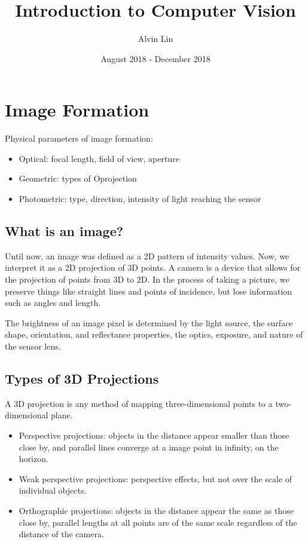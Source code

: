 \documentclass{math}
\title{Introduction to Computer Vision}
\author{Alvin Lin}
\date{August 2018 - December 2018}
\begin{document}
\maketitle

\section*{Image Formation}
Physical parameters of image formation:
\begin{itemize}
  \item Optical: focal length, field of view, aperture
  \item Geometric: types of Oprojection
  \item Photometric: type, direction, intensity of light reaching the sensor
\end{itemize}

\subsection*{What is an image?}
Until now, an image was defined as a 2D pattern of intensity values. Now, we
interpret it as a 2D projection of 3D points. A camera is a device that allows
for the projection of points from 3D to 2D. In the process of taking a picture,
we preserve things like straight lines and points of incidence, but lose
information such as angles and length. \par
The brightness of an image pixel is determined by the light source, the surface
shape, orientation, and reflectance properties, the optics, exposure, and nature
of the sensor lens.

\subsection*{Types of 3D Projections}
A 3D projection is any method of mapping three-dimensional points to a
two-dimensional plane.
\begin{itemize}
  \item Perspective projections: objects in the distance appear smaller than
    those close by, and parallel lines converge at a image point in infinity, on
    the horizon.
  \item Weak perspective projections: perspective effects, but not over the
    scale of individual objects.
  \item Orthographic projections: objects in the distance appear the same as
    those close by, parallel lengths at all points are of the same scale
    regardless of the distance of the camera.
\end{itemize}
\end{document}
